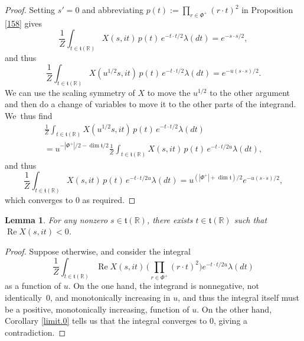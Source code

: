 \documentclass[10pt]{amsart}
\newtheorem{lem}[equation]{Lemma}
\theoremstyle{definition}
\newcommand{\mft}{\mathfrak{t}}
\newcommand{\R}{\mathbb{R}}
\DeclareMathOperator{\RE}{Re}
\numberwithin{equation}{section}
\begin{document}
\begin{proof}
Setting $s'=0$ and abbreviating $p(t) := \prod_{r\in \Phi^+} (r\cdot t)^2$ in Proposition \ref{158} gives
\[
\frac{1}{Z}
\int_{t\in \mft(\R)} X(s,it)
\,p(t)\,
e^{-t\cdot t/2}
\lambda(dt)
=
e^{-s\cdot s/2},
\]
and thus
\[
\frac{1}{Z}
\int_{t\in \mft(\R)} X(u^{1/2}s,it)
\, p(t)\,
e^{-t\cdot t/2}
\lambda(dt)
=
e^{-u(s\cdot s)/2}.
\]
We can use the scaling symmetry of $X$ to move the $u^{1/2}$ to the other
argument and then do a change of variables to move it to the other parts
of the integrand. We~thus find
\begin{multline*}
\frac{1}{Z}
\int_{t\in \mft(\R)} X(u^{1/2}s,it)
\,p(t)\,
e^{-t\cdot t/2}
\lambda(dt)\\
=u^{-|\Phi^+|/2-\dim\mft/2}
\frac{1}{Z}
\int_{t\in \mft(\R)} X(s,it)
\, p(t) \,
e^{-t\cdot t/2u}
\lambda(dt),
\end{multline*}
and thus
\[
\frac{1}{Z}
\int_{t\in \mft(\R)} X(s,it)
\, p(t) \,
e^{-t\cdot t/2u}
\lambda(dt)
=
u^{(|\Phi^+|+\dim\mft)/2}
e^{-u(s\cdot s)/2},
\]
which converges to $0$ as required.
\end{proof}

\begin{lem} \label{t.neg}
For any nonzero $s\in \mft(\R)$, there exists $t\in \mft(\R)$
such that $\RE X(s,it)<0$.
\end{lem}

\begin{proof}
Suppose otherwise, and consider the integral
\[
\frac{1}{Z}
\int_{t\in \mft(\R)}
\RE X(s,it) \,
\biggl(\prod_{r\in \Phi^+} (r\cdot t)^2 \biggr)
e^{-t\cdot t/2u}
\lambda(dt)
\]
as a function of $u$. On the one hand, the integrand is nonnegative,
not identically~0, and monotonically increasing in $u$, and thus the
integral itself must be a positive, monotonically increasing, function of
$u$. On the other hand, Corollary \ref{limit.0} tells us that the
integral converges to 0, giving a contradiction.
\end{proof}
\end{document}
